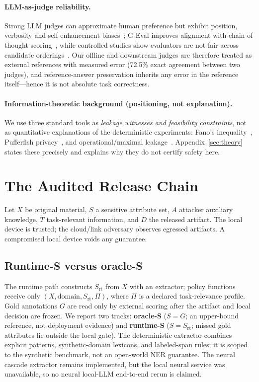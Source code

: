 \documentclass[11pt,a4paper]{article}
\begin{document}
\paragraph{LLM-as-judge reliability.} Strong LLM judges can approximate human preference but exhibit position, verbosity and self-enhancement biases~\cite{zheng2023judging}; G-Eval improves alignment with chain-of-thought scoring~\cite{liu2023geval}, while controlled studies show evaluators are not fair across candidate orderings~\cite{wang2023fair}. Our offline and downstream judges are therefore treated as external references with measured error (72.5\% exact agreement between two judges), and reference-answer preservation inherits any error in the reference itself---hence it is not absolute task correctness.

\paragraph{Information-theoretic background (positioning, not explanation).} We use three standard tools as \emph{leakage witnesses and feasibility constraints}, not as quantitative explanations of the deterministic experiments: Fano's inequality~\cite{cover2006elements}, Pufferfish privacy~\cite{kifer2012rigorous,kifer2014pufferfish}, and operational/maximal leakage~\cite{issa2020operational}. Appendix~\ref{sec:theory} states these precisely and explains why they do not certify safety here.

\section{The Audited Release Chain}\label{sec:chain}

Let $X$ be original material, $S$ a sensitive attribute set, $A$ attacker auxiliary knowledge, $T$ task-relevant information, and $D$ the released artifact. The local device is trusted; the cloud/link adversary observes egressed artifacts. A compromised local device voids any guarantee.

\subsection{Runtime-S versus oracle-S}
The runtime path constructs $S_{\mathrm{rt}}$ from $X$ with an extractor; policy functions receive only $(X,\mathrm{domain},S_{\mathrm{rt}},\Pi)$, where $\Pi$ is a declared task-relevance profile. Gold annotations $G$ are read only by external scoring after the artifact and local decision are frozen. We report two tracks: \textbf{oracle-S} ($S=G$; an upper-bound reference, not deployment evidence) and \textbf{runtime-S} ($S=S_{\mathrm{rt}}$; missed gold attributes lie outside the local gate). The deterministic extractor combines explicit patterns, synthetic-domain lexicons, and labeled-span rules; it is scoped to the synthetic benchmark, not an open-world NER guarantee. The neural cascade extractor remains implemented, but the local neural service was unavailable, so no neural local-LLM end-to-end rerun is claimed.
\end{document}
